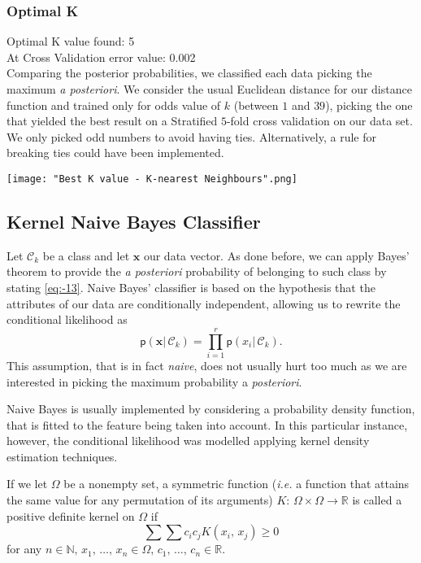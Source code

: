 \documentclass[a4paper]{article}
\begin{document}
\subsubsection{Optimal K}

Optimal K value found: 5\\
At Cross Validation error value: 0.002\\

Comparing the posterior probabilities, we classified each data picking
the maximum \textit{a posteriori}. We consider the usual Euclidean
distance for our distance function and trained only for odds value
of $k$ (between $1$ and $39$), picking the one that yielded the
best result on a Stratified $5$-fold cross validation on our data
set.
We only picked odd numbers to avoid having ties. Alternatively, a rule for breaking ties could have been implemented.

\texttt{[image: "Best K value - K-nearest Neighbours".png]}

\subsection{Kernel Naive Bayes Classifier}
Let $\mathcal{C}_{k}$ be a class and let $\mathbf{x}$ our data vector.
As done before, we can apply Bayes' theorem to provide the \textit{a
	posteriori} probability of belonging to such class by stating \ref{eq:-13}.
Naive Bayes' classifier is based on the hypothesis that the attributes
of our data are conditionally independent, allowing us to rewrite
the conditional likelihood as 
\begin{equation}
\mathsf{p}\left(\mathbf{x}|\,\mathcal{C}_{k}\right)=\prod_{i=1}^{r}\mathsf{p}\left(x_{i}|\,\mathcal{C}_{k}\right).\label{eq:-14}
\end{equation}
This assumption, that is in fact \textit{naive}, does not usually
hurt too much as we are interested in picking the maximum probability
a\textit{ posteriori}.

Naive Bayes is usually implemented by considering a probability density
function, that is fitted to the feature being taken into account.
In this particular instance, however, the conditional likelihood was
modelled applying kernel density estimation techniques.

If we let $\Omega$ be a nonempty set, a symmetric function (\textit{i.e.}
a function that attains the same value for any permutation of its
arguments) $K:\,\Omega\times\Omega\rightarrow\mathbb{R}$ is called
a positive definite kernel on $\Omega$ if 
\begin{equation}
\sum\sum c_{i}c_{j}K\left(x_{i},\,x_{j}\right)\geq0\label{eq:-15}
\end{equation}
for any $n\in\mathbb{N},\,x_{1},\,\ldots,\,x_{n}\in\Omega,\,c_{1},\,\ldots,\,c_{n}\in\mathbb{R}$.
\end{document}
